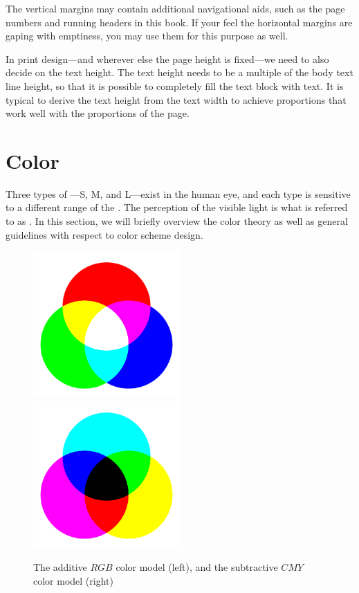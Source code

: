 The vertical margins may contain additional navigational aids, such as the page
numbers and running headers in this book. If your feel the horizontal margins
are gaping with emptiness, you may use them for this purpose as
well.~\cite[sec.\,8.5.2]{bringhurst92}

In print design---and wherever else the page height is fixed---we need to also
decide on the text height. The text height needs to be a multiple of the body
text line height, so that it is possible to completely fill the text block with
text.  It is typical to derive the text height from the text width to achieve
proportions that work well with the proportions of the
page.~\cite[sec.\,8.4.2]{bringhurst92}

\section{Color}
Three types of ---S, M, and L---exist in the human eye, and
each type is sensitive to a different range of the .  The
perception of the visible light is what is referred to as . In this
section, we will briefly overview the color theory as well as general
guidelines with respect to color scheme design.

\begin{figure}
  \includegraphics[width=0.5\textwidth]{examples/03/rgb}%
  \includegraphics[width=0.5\textwidth]{examples/03/cmy}
  \caption{The additive $RGB$ color model (left), and the subtractive $CMY$
    color model (right)}
  \label{fig:color-models}
\end{figure}

